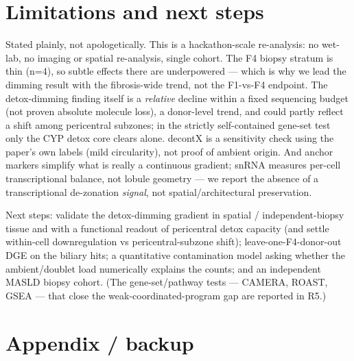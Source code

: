 \documentclass[11pt,a4paper]{article}
\begin{document}
\section{Limitations and next steps}

Stated plainly, not apologetically. This is a hackathon-scale re-analysis: no wet-lab, no imaging or spatial re-analysis, single cohort. The F4 biopsy stratum is thin (n=4), so subtle effects there are underpowered --- which is why we lead the dimming result with the fibrosis-wide trend, not the F1-vs-F4 endpoint. The detox-dimming finding itself is a \emph{relative} decline within a fixed sequencing budget (not proven absolute molecule loss), a donor-level trend, and could partly reflect a shift among pericentral subzones; in the strictly self-contained gene-set test only the CYP detox core clears alone. decontX is a sensitivity check using the paper's own labels (mild circularity), not proof of ambient origin. And anchor markers simplify what is really a continuous gradient; snRNA measures per-cell transcriptional balance, not lobule geometry --- we report the absence of a transcriptional de-zonation \emph{signal}, not spatial/architectural preservation.

Next steps: validate the detox-dimming gradient in spatial / independent-biopsy tissue and with a functional readout of pericentral detox capacity (and settle within-cell downregulation vs pericentral-subzone shift); leave-one-F4-donor-out DGE on the biliary hits; a quantitative contamination model asking whether the ambient/doublet load numerically explains the counts; and an independent MASLD biopsy cohort. (The gene-set/pathway tests --- CAMERA, ROAST, GSEA --- that close the weak-coordinated-program gap are reported in R5.)

\section*{Appendix / backup}
\end{document}
